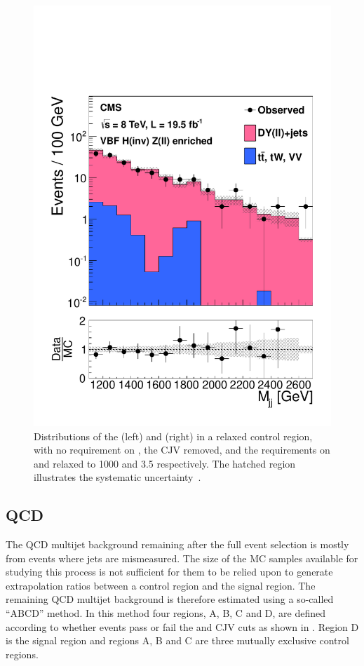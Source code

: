 \begin{figure}
  \includegraphics[width=.6\largefigwidth]{plots/prompt/VBF-ZCtrl-Mjj.pdf}
  \caption{Distributions of the \MET (left) and \Mjj (right) in a relaxed \PZ control region, with no requirement on \dphijj, the \ac{CJV} removed, and the requirements on \Mjj and \detajj relaxed to 1000 \GeV and 3.5 respectively. The hatched region illustrates the systematic uncertainty~\cite{Chatrchyan:2014tja}.}
  \label{fig:promptznunu}
\end{figure}




\subsection{QCD}
\label{sec:promptacQCD}
The \ac{QCD} multijet background remaining after the full event selection is mostly from events where jets are mismeasured. The size of the \ac{MC} samples available for studying this process is not sufficient for them to be relied upon to generate extrapolation ratios between a control region and the signal region. The remaining \ac{QCD} multijet background is therefore estimated using a so-called ``ABCD'' method. In this method four regions, A, B, C and D, are defined according to whether events pass or fail the \MET and \ac{CJV} cuts as shown in . Region D is the signal region and regions A, B and C are three mutually exclusive control regions.

